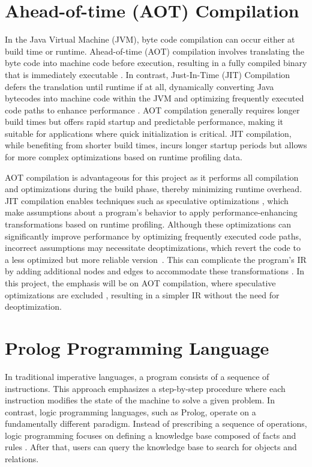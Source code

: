 \section{Ahead-of-time (AOT) Compilation}
In the Java Virtual Machine (JVM), byte code compilation can occur either at build time or runtime. Ahead-of-time (AOT) compilation involves translating the byte code into machine code before execution, resulting in a fully compiled binary that is immediately executable \cite{Wade2017}. In contrast, Just-In-Time (JIT) Compilation defers the translation until runtime if at all, dynamically converting Java bytecodes into machine code within the JVM and optimizing frequently executed code paths to enhance performance \cite{Wade2017}. AOT compilation generally requires longer build times but offers rapid startup and predictable performance, making it suitable for applications where quick initialization is critical. JIT compilation, while benefiting from shorter build times, incurs longer startup periods but allows for more complex optimizations based on runtime profiling data.

AOT compilation is advantageous for this project as it performs all compilation and optimizations during the build phase, thereby minimizing runtime overhead. JIT compilation enables techniques such as speculative optimizations \cite{Duboscq2013Inproceedings}, which make assumptions about a program’s behavior to apply performance-enhancing transformations based on runtime profiling. Although these optimizations can significantly improve performance by optimizing frequently executed code paths, incorrect assumptions may necessitate deoptimizations, which revert the code to a less optimized but more reliable version~\cite{Duboscq2013Inproceedings}. This can complicate the program's IR by adding additional nodes and edges to accommodate these transformations \cite{Duboscq2013Inproceedings}. In this project, the emphasis will be on AOT compilation, where speculative optimizations are excluded \cite{Wimmer2019}, resulting in a simpler IR without the need for deoptimization. 

\section{Prolog Programming Language}

In traditional imperative languages, a program consists of a sequence of instructions.
This approach emphasizes a step-by-step procedure where each instruction modifies the state of the machine to solve a given problem. 
In contrast, logic programming languages, such as Prolog, operate on a fundamentally different paradigm. 
Instead of prescribing a sequence of operations, logic programming focuses on defining a knowledge base composed of facts and rules \cite{Bramer2013}. After that, users can query the knowledge base to search for objects and relations. 

